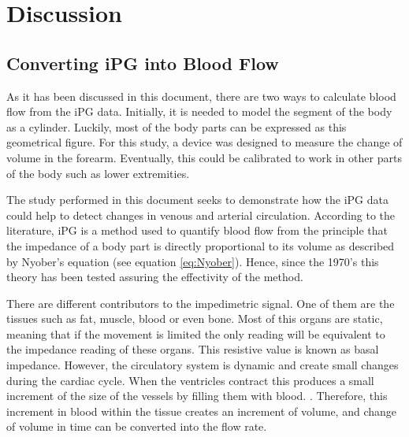 
\chapter{Discussion}  %

\ifpdf
    \graphicspath{{Chapter7/Figs/Raster/}{Chapter7/Figs/PDF/}{Chapter7/Figs/}}
\else
    \graphicspath{{Chapter7/Figs/Vector/}{Chapter7/Figs/}}
\fi


\section{Converting iPG into Blood Flow} %
\label{section discussion 1}
As it has been discussed in this document, there are two ways to calculate blood flow from the iPG data. Initially, it is needed to model the segment of the body as a cylinder. Luckily, most of the body parts can be expressed as this geometrical figure. For this study, a device was designed to measure the change of volume in the forearm. Eventually, this could be calibrated to work in other parts of the body such as lower extremities. 

The study performed in this document seeks to demonstrate how the iPG data could help to detect changes in venous and arterial circulation. According to the literature, iPG is a method used to quantify blood flow from the principle that the impedance of a body part is directly proportional to its volume as described by Nyober's equation  (see equation \ref{eq:Nyober}).  Hence, since the 1970's this theory has been tested assuring the effectivity of the method. 

There are different contributors to the impedimetric signal. One of them are the tissues such as fat, muscle, blood or even bone. Most of this organs are static, meaning that if the movement is limited the only reading will be equivalent to the impedance reading of these organs. This resistive value is known as basal impedance.  However,  the circulatory system is dynamic and create small changes during the cardiac cycle.  When the ventricles contract this produces a small increment of the size of the vessels by filling them with blood. 
. Therefore, this increment in blood within the tissue creates an increment of volume, and change of volume in time can be converted into the flow rate.

